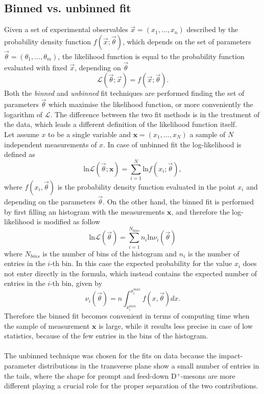 \documentclass[b5paper,10pt,twoside,oldstyle,classica]{toptesi}
\begin{document}
\subsection{Binned vs. unbinned fit}
Given a set of experimental observables $\vec{x}=(x_1,...,x_n)$ described by the probability density function $f(\vec{x}; \vec{\theta})$, which depends on the set of parameters $\vec{\theta} = (\theta_1,...,\theta_m)$, the likelihood function is equal to the probability function evaluated with fixed $\vec{x}$, depending on $\vec{\theta}$
\begin{equation}
 \mathcal{L}(\vec{\theta}; \vec{x}) = f(\vec{x}; \vec{\theta}).
\end{equation}
Both the \textit{binned} and \textit{unbinned} fit techniques are performed finding the set of parameters $\vec{\theta}$ which maximise the likelihood function, or more conveniently the logarithm of $\mathcal{L}$. 
The difference between the two fit methods is in the treatment of the data, which leads a different definition of the likelihood function itself.\\ Let assume $x$ to be a single variable and $\pmb{x}=(x_1,...,x_N)$ a sample of $N$ independent measurements of $x$. In case of unbinned fit the log-likelihood is defined as
\begin{equation}
\text{ln}\mathcal{L}(\vec{\theta}; \pmb{x}) = \sum_{i=1}^{N} \text{ln}f(x_i; \vec{\theta}),
\end{equation}
where $f(x_i,\vec{\theta})$ is the probability density function evaluated in the point $x_i$ and depending on the parameters $\vec{\theta}$.
On the other hand, the binned fit is performed by first filling an histogram with the measurements $\pmb{x}$, and therefore the log-likelihood is modified as follow
\begin{equation}
 \text{ln}\mathcal{L}(\vec{\theta}) = \sum_{i=1}^{N_{bins}} n_i\text{ln}\nu_i(\vec{\theta})
\end{equation}
where $N_{bins}$ is the number of bins of the histogram and $n_i$ is the number of entries in the $i$-th bin. In this case the expected probability for the value $x_i$ does not enter directly in the formula, which instead contains the expected number of entries in the $i$-th bin, given by
\begin{equation}
 \nu_i(\vec{\theta}) = n\int_{x_i^{min}}^{x_i^{max}}f(x,\vec{\theta})dx.
\end{equation}
Therefore the binned fit becomes convenient in terms of computing time when the sample of measurement $\pmb{x}$ is large, while it results less precise in case of low statistics, because of the few entries in the bins of the histogram.\\\\
The unbinned technique was chosen for the fits on data because the impact-parameter distributions in the transverse plane show a small number of entries in the tails, where the shape for prompt and feed-down D$^+$-mesons are more different playing a crucial role for the proper separation of the two contributions.  
\end{document}
